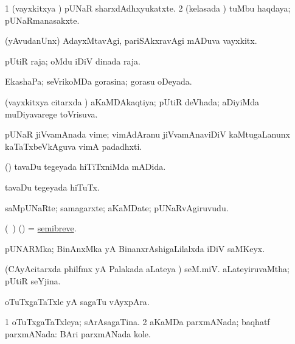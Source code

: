 \bentry
{}
\gl{\nA}
\bmng
\bnum
\num{1} (vayxkitxya \vi) pUNaR sharxdAdhxyukatxte. 
\num{2} (kelasada \vi) tuMbu haqdaya; pUNaRmanasakxte. 
\enum
\emng
\eentry

\bentry
{}
\gl{\nA}
\bmng
(yAvudanUnx) AdayxMtavAgi, pariSAkxravAgi mADuva vayxkitx. 
\emng
\eentry

\bentry
{}
\gl{\nA}
\bmng
pUtiR raja; oMdu iDiV dinada raja. 
\emng
\eentry

\bentry
{} 
\gl{\gu}
\expl{}
\bmng
EkashaPa; seVrikoMDa gorasina; gorasu oDeyada. 
\emng
\eentry

\bentry
{}
\gl{\gu}
\bmng
(vayxkitxya citarxda \vi) aKaMDAkaqtiya; pUtiR deVhada; aDiyiMda muDiyavarege toVrisuva. 
\emng
\eentry

\bentry
{}
\gl{\nA}
\bmng
pUNaR jiVvamAnada vime; vimAdAranu jiVvamAnaviDiV kaMtugaLanunx kaTaTxbeVkAguva vimA padadhxti. 
\emng
\eentry

\bentry
{}
\gl{\gu}
\bmng
(\birx) tavaDu tegeyada hiTiTxniMda mADida. 
\emng
\eentry

\bentry
{}
\gl{\nA}
\bmng
tavaDu tegeyada hiTuTx. 
\emng
\eentry

\bentry
{}
\gl{\nA}
\bmng
saMpUNaRte; samagarxte; aKaMDate; pUNaRvAgiruvudu. 
\emng
\eentry

\bentry
{}
\gl{\nA}
\bmng
(\kanmu\ \ame) (\saM) = \hyperref{kandict_s.pdf}{S}{semibreve}{semibreve}. 
\emng
\eentry

\bentry
{}
\gl{\nA}
\bmng
pUNARMka; BinAnxMka yA BinanxrAshigaLilalxda iDiV saMKeyx. 
\emng
\eentry

\bentry
{} 
\gl{\gu}
\expl{}
\bmng
(CAyAcitarxda philfmx yA Palakada aLateya \vi)  seM.miV. aLateyiruvaMtha; pUtiR seYjina. 
\emng
\eentry

\bentry
{} 
\gl{\nA}
\expl{}
\bmng
oTuTxgaTaTxle yA sagaTu vAyxpAra. 
\emng
\eentry

\bentry
{} 
\gl{\gu}
\bmng
\bnum
\num{1} oTuTxgaTaTxleya; sArAsagaTina. 
\num{2} aKaMDa parxmANada; baqhatf parxmANada:  BAri parxmANada kole. 
\enum
\emng
\eentry

